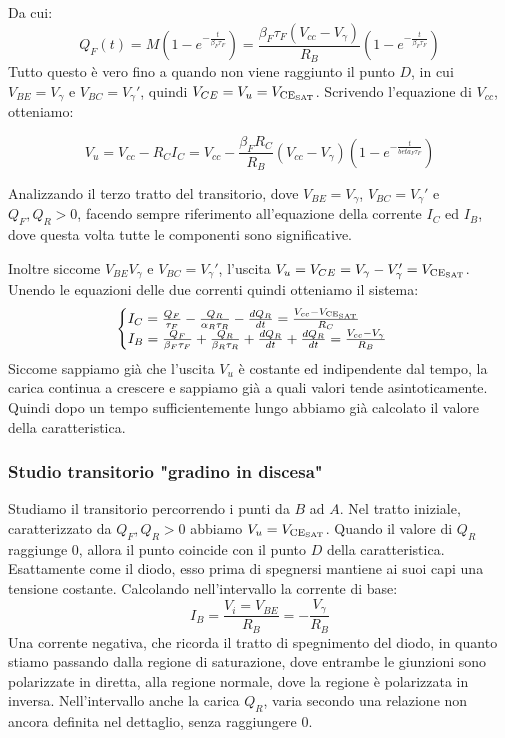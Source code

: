 \documentclass[../template]{subfiles}
\begin{document}
Da cui:
\[
    Q_F(t) = M(1 - e^{-\frac{t}{\beta_F \tau_F}}) = \frac{\beta_F \tau_F (V_{cc} - V_\gamma)}{R_B} (1 - e^{-\frac{t}{\beta_F \tau_F}})
\]
Tutto questo è vero fino a quando non viene raggiunto il punto $D$, in cui $V_{BE} = V_\gamma$ e $V_{BC} = V_\gamma'$, quindi $V_{CE} = V_u = V_{\text{CE}_{\text{SAT}}}$.
Scrivendo l'equazione di $V_{cc}$, otteniamo:

\[
    V_u = V_{cc} - R_C I_C = V_{cc} - \frac{\beta_F R_C}{R_B} (V_{cc} - V_\gamma) (1 - e ^ {-\frac{t}{beta_F \tau_F}})
\]


Analizzando il terzo tratto del transitorio, dove $V_{BE} = V_\gamma$, $V_{BC} = V_\gamma'$ e $Q_F, Q_R > 0$, facendo sempre riferimento
all'equazione della corrente $I_C$ ed $I_B$, dove questa volta tutte le componenti sono significative.

Inoltre siccome $V_{BE} V_\gamma$ e $V_{BC} = V_\gamma'$, l'uscita $V_u = V_{CE} = V_\gamma - V_\gamma' = V_{\text{CE}_{\text{SAT}}}$. Unendo le equazioni delle due correnti quindi otteniamo il sistema:
\[\begin{cases}
    I_C = \frac{Q_F}{\tau_F} - \frac{Q_R}{\alpha_R \tau_R} - \frac{dQ_R}{dt} = \frac{V_{cc} - V_{\text{CE}_{\text{SAT}}}}{R_C}
    \\
    I_B = \frac{Q_F}{\beta_F\tau_F} + \frac{Q_R}{\beta_R \tau_R} + \frac{dQ_R}{dt} + \frac{dQ_R}{dt}= \frac{V_{cc} - V_\gamma}{R_B}
\end{cases}\]
Siccome sappiamo già che l'uscita $V_u$ è costante ed indipendente dal tempo, la carica continua a crescere e sappiamo già a quali valori tende asintoticamente. Quindi dopo un tempo sufficientemente lungo abbiamo già calcolato il valore della caratteristica.

\subsubsection{Studio transitorio "gradino in discesa"}
Studiamo il transitorio percorrendo i punti da $B$ ad $A$.
Nel tratto iniziale, caratterizzato da $Q_F, Q_R > 0$ abbiamo $V_u = V_{\text{CE}_{\text{SAT}}}$. Quando il valore di $Q_R$ raggiunge 0, allora il punto coincide con il punto $D$ della caratteristica. Esattamente come il diodo, esso prima di spegnersi mantiene ai suoi capi una tensione costante.
Calcolando nell'intervallo la corrente di base:
\[
    I_B = \frac{V_i = V_{BE}} {R_B} = -\frac{V_\gamma}{R_B}
\]
Una corrente negativa, che ricorda il tratto di spegnimento del diodo, in quanto stiamo passando dalla regione di saturazione, dove entrambe le giunzioni sono polarizzate in diretta, alla regione normale, dove la regione è polarizzata in inversa. Nell'intervallo anche la carica $Q_R$, varia secondo una relazione non ancora definita nel dettaglio, senza raggiungere 0.
\end{document}
